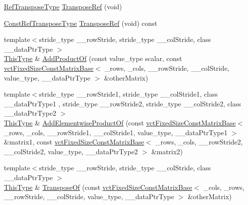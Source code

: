 \begin{DoxyCompactItemize}
\item 
\hyperlink{classvct_fixed_size_const_matrix_base_a8d6e7ad2cf2cd82aebbc3de0d6479dbe}{Ref\+Transpose\+Type} \hyperlink{classvct_fixed_size_matrix_base_a8652991f4652d49f52c33a20e293b355}{Transpose\+Ref} (void)
\item 
\hyperlink{classvct_fixed_size_const_matrix_base_a41d41a9a3dc6d0c8e36348a8c2fc83db}{Const\+Ref\+Transpose\+Type} \hyperlink{classvct_fixed_size_matrix_base_a6189c6f8514507c6d96401cc8537c121}{Transpose\+Ref} (void) const 
\item 
{\footnotesize template$<$stride\+\_\+type \+\_\+\+\_\+row\+Stride, stride\+\_\+type \+\_\+\+\_\+col\+Stride, class \+\_\+\+\_\+data\+Ptr\+Type $>$ }\\\hyperlink{classvct_fixed_size_const_matrix_base_a7ec66a96ed7e08ce9ff54093133c9d8d}{This\+Type} \& \hyperlink{classvct_fixed_size_matrix_base_abb7e005c519dc3ab9b8cfe800027b649}{Add\+Product\+Of} (const value\+\_\+type scalar, const \hyperlink{classvct_fixed_size_const_matrix_base}{vct\+Fixed\+Size\+Const\+Matrix\+Base}$<$ \+\_\+rows, \+\_\+cols, \+\_\+\+\_\+row\+Stride, \+\_\+\+\_\+col\+Stride, value\+\_\+type, \+\_\+\+\_\+data\+Ptr\+Type $>$ \&other\+Matrix)
\item 
{\footnotesize template$<$stride\+\_\+type \+\_\+\+\_\+row\+Stride1, stride\+\_\+type \+\_\+\+\_\+col\+Stride1, class \+\_\+\+\_\+data\+Ptr\+Type1 , stride\+\_\+type \+\_\+\+\_\+row\+Stride2, stride\+\_\+type \+\_\+\+\_\+col\+Stride2, class \+\_\+\+\_\+data\+Ptr\+Type2 $>$ }\\\hyperlink{classvct_fixed_size_const_matrix_base_a7ec66a96ed7e08ce9ff54093133c9d8d}{This\+Type} \& \hyperlink{classvct_fixed_size_matrix_base_adf78b1be92121cada1de6cde352a36ac}{Add\+Elementwise\+Product\+Of} (const \hyperlink{classvct_fixed_size_const_matrix_base}{vct\+Fixed\+Size\+Const\+Matrix\+Base}$<$ \+\_\+rows, \+\_\+cols, \+\_\+\+\_\+row\+Stride1, \+\_\+\+\_\+col\+Stride1, value\+\_\+type, \+\_\+\+\_\+data\+Ptr\+Type1 $>$ \&matrix1, const \hyperlink{classvct_fixed_size_const_matrix_base}{vct\+Fixed\+Size\+Const\+Matrix\+Base}$<$ \+\_\+rows, \+\_\+cols, \+\_\+\+\_\+row\+Stride2, \+\_\+\+\_\+col\+Stride2, value\+\_\+type, \+\_\+\+\_\+data\+Ptr\+Type2 $>$ \&matrix2)
\item 
{\footnotesize template$<$stride\+\_\+type \+\_\+\+\_\+row\+Stride, stride\+\_\+type \+\_\+\+\_\+col\+Stride, class \+\_\+\+\_\+data\+Ptr\+Type $>$ }\\\hyperlink{classvct_fixed_size_const_matrix_base_a7ec66a96ed7e08ce9ff54093133c9d8d}{This\+Type} \& \hyperlink{classvct_fixed_size_matrix_base_a65e4f750f2e62ce8732ce58f29d25427}{Transpose\+Of} (const \hyperlink{classvct_fixed_size_const_matrix_base}{vct\+Fixed\+Size\+Const\+Matrix\+Base}$<$ \+\_\+cols, \+\_\+rows, \+\_\+\+\_\+row\+Stride, \+\_\+\+\_\+col\+Stride, value\+\_\+type, \+\_\+\+\_\+data\+Ptr\+Type $>$ \&other\+Matrix)

\end{DoxyCompactItemize}
